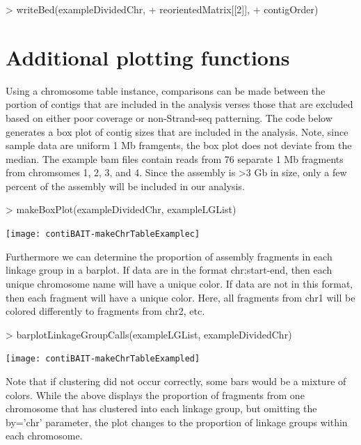\documentclass{article}
\begin{document}
\begin{Schunk}
\begin{Sinput}
> writeBed(exampleDividedChr,
+ reorientedMatrix[[2]],
+ contigOrder)
\end{Sinput}
\end{Schunk}

\newpage
\section{Additional plotting functions}

Using a chromosome table instance, comparisons can be made between the portion of contigs that are included in the analysis verses those that are excluded based on either poor coverage or non-Strand-seq patterning. The code below generates a box plot of contig sizes that are included in the analysis. Note, since sample data are uniform 1 Mb framgents, the box plot does not deviate from the median.  The example bam files contain reads from 76 separate 1 Mb fragments from chromsomes 1, 2, 3, and 4.  Since the assembly is >3 Gb in size, only a few percent of the assembly will be included in our analysis.

\begin{Schunk}
\begin{Sinput}
> makeBoxPlot(exampleDividedChr, exampleLGList)
\end{Sinput}
\end{Schunk}
\texttt{[image: contiBAIT-makeChrTableExamplec]}

\newpage
Furthermore we can determine the proportion of assembly fragments in each linkage group in a barplot. If data are in the format chr:start-end, then each unique chromosome name will have a unique color. If data are not in this format, then each fragment will have a unique color.  Here, all fragments from chr1 will be colored differently to fragments from chr2, etc.

\begin{Schunk}
\begin{Sinput}
> barplotLinkageGroupCalls(exampleLGList, exampleDividedChr)
\end{Sinput}
\end{Schunk}
\texttt{[image: contiBAIT-makeChrTableExampled]}

Note that if clustering did not occur correctly, some bars would be a mixture of colors.  While the above displays the proportion of fragments from one chromosome that has clustered into each linkage group, but omitting the by='chr' parameter, the plot changes to the proportion of linkage groups within each chromosome.
\end{document}
